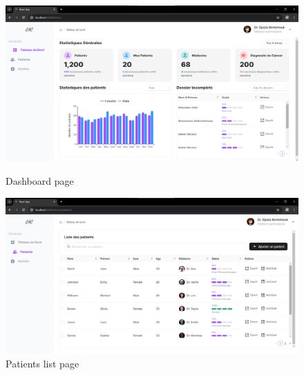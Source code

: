 \documentclass[
11pt, %
english, %
singlespacing, %
headsepline, %
]{project_structure}
\begin{document}
\begin{figure}[H]
    \centering
    \begin{minipage}{0.49\textwidth}
        \centering
        \includegraphics[width=1\linewidth]{figures/SI/web/dashboard.png}
         \caption{Dashboard page}
        \label{fig:dashboard}
    \end{minipage}
    \hfill
    \begin{minipage}{0.49\textwidth}
        \centering
         \includegraphics[width=1\linewidth]{figures/SI/web/patients.png}
        \caption{Patients list page}
        \label{fig:patients}
    \end{minipage}
\end{figure}
\end{document}
